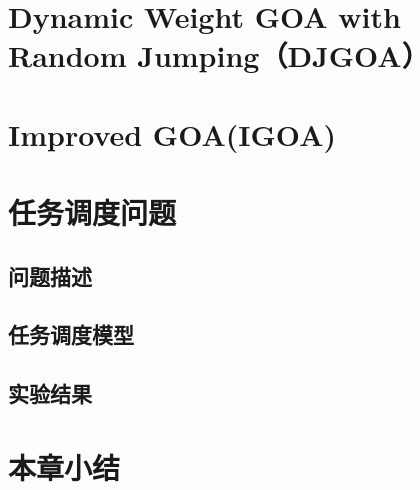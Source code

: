 \section{Dynamic Weight GOA with Random Jumping（DJGOA）}

\section{Improved GOA(IGOA)}

\section{任务调度问题}
\subsection{问题描述}
\subsection{任务调度模型}
\subsection{实验结果}


\section{本章小结}